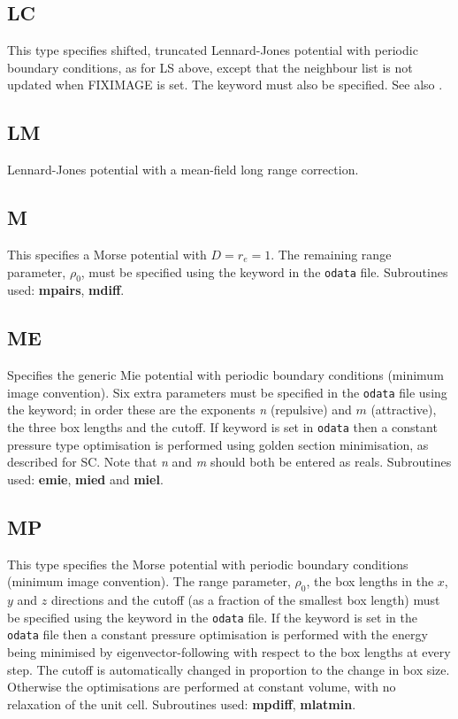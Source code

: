 {{{\subsection{LC}This type specifies shifted, truncated Lennard-Jones potential with 
periodic boundary conditions, as for LS above, except that the neighbour list is not
updated when FIXIMAGE is set. The {} keyword must also be 
specified. See also {}.

\subsection{LM}Lennard-Jones potential with a mean-field long range correction.

\subsection{M}This specifies a Morse potential with $D=r_e=1$. 
The remaining range parameter,\cite{braierbw90} $\rho_0$, must be specified using the {} keyword
in the {\tt odata} file.
Subroutines used: {\bf mpairs}, {\bf mdiff}.

\subsection{ME}Specifies the generic Mie potential with periodic boundary conditions (minimum
image convention). Six extra parameters must be specified in the {\tt odata} file using the
{} keyword;
in order these are the exponents {\it n\/} (repulsive) and $m$ (attractive), the three box
lengths and the cutoff. If keyword {} is set in {\tt odata}
then a constant pressure type optimisation is performed
using golden section minimisation, as described for SC. Note that
{\it n\/} and {\it m\/} should both be entered as reals. Subroutines used: {\bf emie}, {\bf mied}
and {\bf miel}. 

\subsection{MP}This type specifies the Morse potential with 
periodic boundary conditions (minimum image convention\cite{allent87}). 
The range parameter, $\rho_0$, the box lengths in the $x$, $y$ and $z$ 
directions and the cutoff (as a fraction of the smallest box length)
must be specified using the {} keyword in the {\tt odata} file.
If the keyword {} is set in the {\tt odata} file
then a constant pressure optimisation is performed
with the energy being minimised by eigenvector-following with respect to the 
box lengths at every step. 
The cutoff is automatically changed in proportion to the change in box size.
Otherwise the optimisations are performed at constant volume, with no 
relaxation of the unit cell. 
Subroutines used: {\bf mpdiff}, {\bf mlatmin}.

}}}
